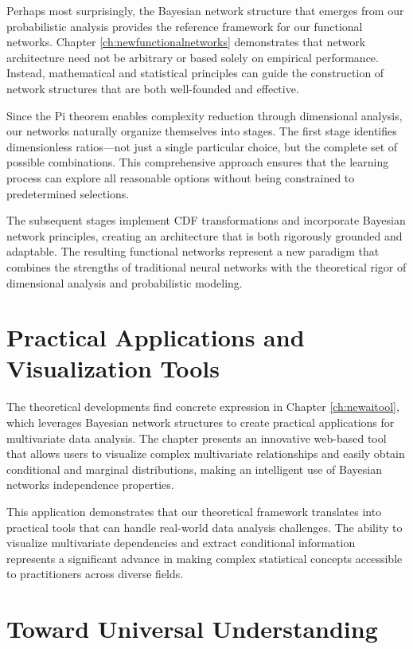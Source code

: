 \documentclass[
	11pt, %
	fleqn, %
	a4paper, %
]{LegrandOrangeBook}
\begin{document}
Perhaps most surprisingly, the Bayesian network structure that emerges from our probabilistic analysis provides the reference framework for our functional networks. Chapter \ref{ch:newfunctionalnetworks} demonstrates that network architecture need not be arbitrary or based solely on empirical performance. Instead, mathematical and statistical principles can guide the construction of network structures that are both well-founded and effective.

Since the Pi theorem enables complexity reduction through dimensional analysis, our networks naturally organize themselves into stages. The first stage identifies dimensionless ratios—not just a single particular choice, but the complete set of possible combinations. This comprehensive approach ensures that the learning process can explore all reasonable options without being constrained to predetermined selections.

The subsequent stages implement CDF transformations and incorporate Bayesian network principles, creating an architecture that is both rigorously grounded and adaptable. The resulting functional networks represent a new paradigm that combines the strengths of traditional neural networks with the theoretical rigor of dimensional analysis and probabilistic modeling.

\section{Practical Applications and Visualization Tools}

The theoretical developments find concrete expression in Chapter \ref{ch:newaitool}, which leverages Bayesian network structures to create practical applications for multivariate data analysis. The chapter presents an innovative web-based tool that allows users to visualize complex multivariate relationships and easily obtain conditional and marginal distributions, making an intelligent use of Bayesian networks independence properties.

This application demonstrates that our theoretical framework translates into practical tools that can handle real-world data analysis challenges. The ability to visualize multivariate dependencies and extract conditional information represents a significant advance in making complex statistical concepts accessible to practitioners across diverse fields.

\section{Toward Universal Understanding}
\end{document}
